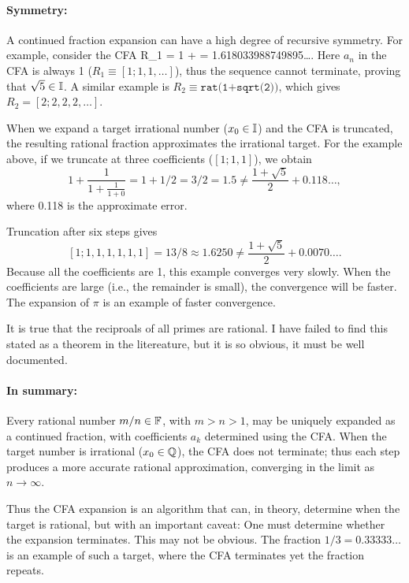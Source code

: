 \documentclass{ximera}
\begin{document}
\paragraph{Symmetry:}
A continued fraction expansion can have a high degree of recursive symmetry. 
For example, consider the CFA
\be
R_1 \equiv {} = 1 +  = 1.618033988749895\dots.
\label{eq:R1}
\ee
Here $a_n$ in the CFA is always 1 ($R_1 \equiv [1; 1, 1, \dots]$), thus the sequence cannot
terminate, proving that $\sqrt{5} \in \mathbb{I}$.  A similar example is $R_2 \equiv \texttt{rat(1+sqrt(2))}$,
which gives $R_2=[2; 2, 2, 2, \dots]$.

When we expand a target irrational number ($x_0\in \mathbb{I}$) and the CFA is truncated, the resulting rational
fraction approximates the irrational target. For the example above, if we truncate at three
coefficients ($[1; 1, 1]$), we obtain
\[
1 + \frac{1}{1+\frac{1}{1 + 0}} = 1+ 1/2 = 3/2 = 1.5 \neq \frac{1+\sqrt{5}}{2}+0.118\dots,
\]
where 0.118 is the approximate error.

Truncation after six steps gives
\[
[1; 1, 1, 1, 1, 1, 1]= 13/8 \approx 1.6250 \neq \frac{1+\sqrt{5}}{2} +0.0070\dots.
\]
Because all the coefficients are 1, this example converges very slowly.
When the coefficients are large (i.e., the remainder is small), the convergence will be faster. The expansion of
$\pi$ is an example of faster convergence.

It is true that the reciproals of all primes are rational. %
I have failed to find this stated as a theorem in the litereature, but it is so obvious, it must be well documented.


\paragraph{In summary:}
Every rational number $m/n \in \mathbb{F}$, with $m>n>1$, may be uniquely expanded as a continued fraction, with
coefficients $a_k$ determined using the CFA.  When the target number is irrational ($x_0 \in \mathbb{Q}$), the
CFA does not terminate; thus each step produces a more accurate rational approximation, converging in the
limit as $n \rightarrow \infty$. 
 
Thus the CFA expansion is an algorithm that can, in theory, determine when the target is rational, but with
an important caveat: One must determine whether the expansion terminates. This may not be obvious.  The fraction
$1/3 = 0.33333 \dots$ is an example of such a target, where the CFA terminates yet the fraction repeats.
\end{document}
